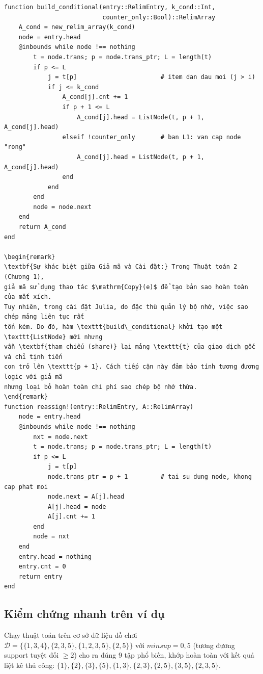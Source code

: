 \documentclass[12pt,a4paper]{report}
\newtheorem{remark}{Nhận xét}[chapter]
\begin{document}
\begin{lstlisting}[style=julia, caption={Hàm \texttt{build\_conditional} và \texttt{reassign!} (relim.jl)},
                   label={lst:relim-helpers}]
function build_conditional(entry::RelimEntry, k_cond::Int,
                           counter_only::Bool)::RelimArray
    A_cond = new_relim_array(k_cond)
    node = entry.head
    @inbounds while node !== nothing
        t = node.trans; p = node.trans_ptr; L = length(t)
        if p <= L
            j = t[p]                       # item dan dau moi (j > i)
            if j <= k_cond
                A_cond[j].cnt += 1
                if p + 1 <= L
                    A_cond[j].head = ListNode(t, p + 1, A_cond[j].head)
                elseif !counter_only       # ban L1: van cap node "rong"
                    A_cond[j].head = ListNode(t, p + 1, A_cond[j].head)
                end
            end
        end
        node = node.next
    end
    return A_cond
end
 
\begin{remark}
\textbf{Sự khác biệt giữa Giả mã và Cài đặt:} Trong Thuật toán 2 (Chương 1),
giả mã sử dụng thao tác $\mathrm{Copy}(e)$ để tạo bản sao hoàn toàn của mắt xích.
Tuy nhiên, trong cài đặt Julia, do đặc thù quản lý bộ nhớ, việc sao chép mảng liên tục rất
tốn kém. Do đó, hàm \texttt{build\_conditional} khởi tạo một \texttt{ListNode} mới nhưng
vẫn \textbf{tham chiếu (share)} lại mảng \texttt{t} của giao dịch gốc và chỉ tịnh tiến
con trỏ lên \texttt{p + 1}. Cách tiếp cận này đảm bảo tính tương đương logic với giả mã
nhưng loại bỏ hoàn toàn chi phí sao chép bộ nhớ thừa.
\end{remark}
function reassign!(entry::RelimEntry, A::RelimArray)
    node = entry.head
    @inbounds while node !== nothing
        nxt = node.next
        t = node.trans; p = node.trans_ptr; L = length(t)
        if p <= L
            j = t[p]
            node.trans_ptr = p + 1         # tai su dung node, khong cap phat moi
            node.next = A[j].head
            A[j].head = node
            A[j].cnt += 1
        end
        node = nxt
    end
    entry.head = nothing
    entry.cnt = 0
    return entry
end
\end{lstlisting}

\subsection{Kiểm chứng nhanh trên ví dụ}

Chạy thuật toán trên cơ sở dữ liệu đồ chơi
$\mathcal{D} = \{\{1,3,4\}, \{2,3,5\}, \{1,2,3,5\}, \{2,5\}\}$ với
$minsup = 0{,}5$ (tương đương support tuyệt đối $\geq 2$) cho ra đúng 9 tập phổ
biến, khớp hoàn toàn với kết quả liệt kê thủ công:
$\{1\}, \{2\}, \{3\}, \{5\}, \{1,3\}, \{2,3\}, \{2,5\}, \{3,5\}, \{2,3,5\}$.
\end{document}
